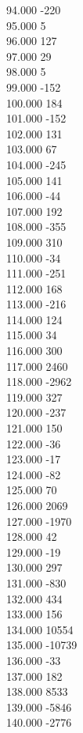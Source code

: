 { 94.000	-220 \\
 95.000	5 \\
 96.000	127 \\
 97.000	29 \\
 98.000	5 \\
 99.000	-152 \\
 100.000	184 \\
 101.000	-152 \\
 102.000	131 \\
 103.000	67 \\
 104.000	-245 \\
 105.000	141 \\
 106.000	-44 \\
 107.000	192 \\
 108.000	-355 \\
 109.000	310 \\
 110.000	-34 \\
 111.000	-251 \\
 112.000	168 \\
 113.000	-216 \\
 114.000	124 \\
 115.000	34 \\
 116.000	300 \\
 117.000	2460 \\
 118.000	-2962 \\
 119.000	327 \\
 120.000	-237 \\
 121.000	150 \\
 122.000	-36 \\
 123.000	-17 \\
 124.000	-82 \\
 125.000	70 \\
 126.000	2069 \\
 127.000	-1970 \\
 128.000	42 \\
 129.000	-19 \\
 130.000	297 \\
 131.000	-830 \\
 132.000	434 \\
 133.000	156 \\
 134.000	10554 \\
 135.000	-10739 \\
 136.000	-33 \\
 137.000	182 \\
 138.000	8533 \\
 139.000	-5846 \\
 140.000	-2776 \\
}
